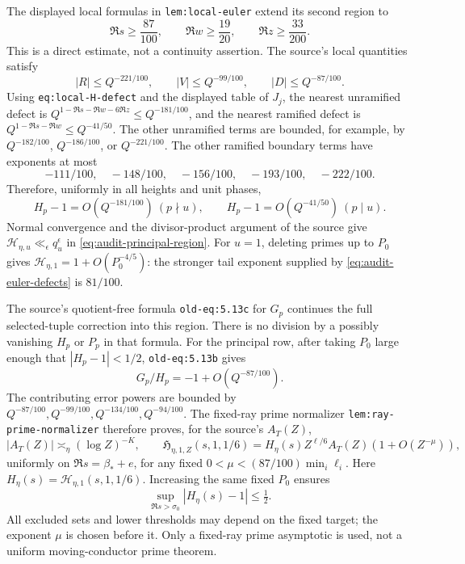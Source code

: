 \documentclass[11pt,a4paper]{article}
\numberwithin{equation}{section}
\theoremstyle{remark}
\begin{document}
The displayed local formulas in \texttt{lem:local-euler} extend its
second region to
\begin{equation}
 \Re s\ge\frac{87}{100},\qquad
 \Re w\ge\frac{19}{20},\qquad
 \Re z\ge\frac{33}{200}.
 \label{eq:audit-principal-region}
\end{equation}
This is a direct estimate, not a continuity assertion.  The source's
local quantities satisfy
\[
 |R|\le Q^{-221/100},\qquad |V|\le Q^{-99/100},\qquad
 |D|\le Q^{-87/100}.
\]
Using \texttt{eq:local-H-defect} and the displayed table of \(J_j\),
the nearest unramified defect is
\(Q^{1-\Re s-\Re w-6\Re z}\le Q^{-181/100}\), and the nearest
ramified defect is \(Q^{1-\Re s-\Re w}\le Q^{-41/50}\).
The other unramified terms are bounded, for example, by
\(Q^{-182/100}\), \(Q^{-186/100}\), or \(Q^{-221/100}\).
The other ramified boundary terms have exponents at most
\[
 -111/100,\quad -148/100,\quad -156/100,\quad -193/100,\quad -222/100.
\]
Therefore, uniformly in all heights and unit phases,
\begin{equation}
 H_p-1=O(Q^{-181/100})\ (p\nmid u),\qquad
 H_p-1=O(Q^{-41/50})\ (p\mid u).
 \label{eq:audit-euler-defects}
\end{equation}
Normal convergence and the divisor-product argument of the source give
\(\mathcal H_{\eta,u}\ll_\epsilon q_u^\epsilon\) in
\eqref{eq:audit-principal-region}.  For \(u=1\), deleting primes up to
\(P_0\) gives \(\mathcal H_{\eta,1}=1+O(P_0^{-4/5})\): the stronger
tail exponent supplied by \eqref{eq:audit-euler-defects} is \(81/100\).

The source's quotient-free formula \texttt{old-eq:5.13c} for \(G_p\)
continues the full selected-tuple correction into this region.  There
is no division by a possibly vanishing \(H_p\) or \(P_p\) in that
formula.  For the principal row, after taking \(P_0\) large enough that
\(|H_p-1|<1/2\), \texttt{old-eq:5.13b} gives
\[
 G_p/H_p=-1+O(Q^{-87/100}).
\]
The contributing error powers are bounded by
\(Q^{-87/100},Q^{-99/100},Q^{-134/100},Q^{-94/100}\).
The fixed-ray prime normalizer \texttt{lem:ray-prime-normalizer}
therefore proves, for the source's \(A_T(Z)\),
\begin{equation}
 |A_T(Z)|\asymp_\eta(\log Z)^{-K},\qquad
 \mathfrak H_{\eta,1,Z}(s,1,1/6)
 =H_\eta(s)Z^{\ell/6}A_T(Z)(1+O(Z^{-\mu})),
 \label{eq:audit-normalizer}
\end{equation}
uniformly on \(\Re s=\beta_*+e\), for any fixed
\(0<\mu<(87/100)\min_i\ell_i\).  Here
\(H_\eta(s)=\mathcal H_{\eta,1}(s,1,1/6)\).
Increasing the same fixed \(P_0\) ensures
\[
 \sup_{\Re s>\sigma_0}|H_\eta(s)-1|\le\tfrac12.
\]
All excluded sets and lower thresholds may depend on the fixed target;
the exponent \(\mu\) is chosen before it.  Only a fixed-ray prime
asymptotic is used, not a uniform moving-conductor prime theorem.
\end{document}
